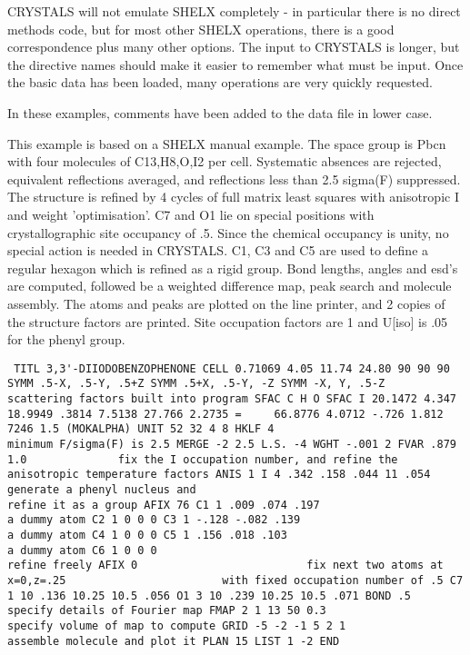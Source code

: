 \documentclass[10pt,a4paper]{report}
\begin{document}
CRYSTALS will not emulate SHELX completely - in particular there is no direct methods code, but for most other SHELX operations, there is a good  correspondence plus many other options. The input to CRYSTALS is longer, but the directive names should make it easier to remember what must be input. Once the basic data has been loaded, many operations are very quickly requested.



In these examples, comments have been added to the data file in lower case.



\bigskip{}

This example is based on a SHELX manual example. The space group is Pbcn with four molecules of C13,H8,O,I2 per cell. Systematic absences are rejected, equivalent reflections averaged, and reflections less than 2.5 sigma(F) suppressed. The structure is refined by 4 cycles of full matrix least squares with anisotropic I and weight 'optimisation'. C7 and O1 lie on special positions with crystallographic site occupancy of .5. Since the chemical occupancy is unity, no special action is needed in CRYSTALS. C1, C3 and C5  are used to define a regular hexagon which is refined as a rigid group. Bond lengths, angles and esd's are  computed, followed be a weighted difference map, peak search and molecule assembly. The atoms and peaks are plotted on the line printer, and 2 copies of the structure factors are printed. Site occupation factors are 1 and U[iso] is .05 for the phenyl group.\small\begin{verbatim} TITL 3,3'-DIIODOBENZOPHENONE CELL 0.71069 4.05 11.74 24.80 90 90 90 SYMM .5-X, .5-Y, .5+Z SYMM .5+X, .5-Y, -Z SYMM -X, Y, .5-Z                    scattering factors built into program SFAC C H O SFAC I 20.1472 4.347 18.9949 .3814 7.5138 27.766 2.2735 =     66.8776 4.0712 -.726 1.812 7246 1.5 (MOKALPHA) UNIT 52 32 4 8 HKLF 4                                minimum F/sigma(F) is 2.5 MERGE -2 2.5 L.S. -4 WGHT -.001 2 FVAR .879 1.0              fix the I occupation number, and refine the                           anisotropic temperature factors ANIS 1 I 4 .342 .158 .044 11 .054                            generate a phenyl nucleus and                                      refine it as a group AFIX 76 C1 1 .009 .074 .197                                             a dummy atom C2 1 0 0 0 C3 1 -.128 -.082 .139                                             a dummy atom C4 1 0 0 0 C5 1 .156 .018 .103                                             a dummy atom C6 1 0 0 0                                            refine freely AFIX 0                          fix next two atoms at x=0,z=.25                        with fixed occupation number of .5 C7 1 10 .136 10.25 10.5 .056 O1 3 10 .239 10.25 10.5 .071 BOND .5                           specify details of Fourier map FMAP 2 1 13 50 0.3                         specify volume of map to compute GRID -5 -2 -1 5 2 1                            assemble molecule and plot it PLAN 15 LIST 1 -2 END\end{verbatim}\normalsize
\end{document}
